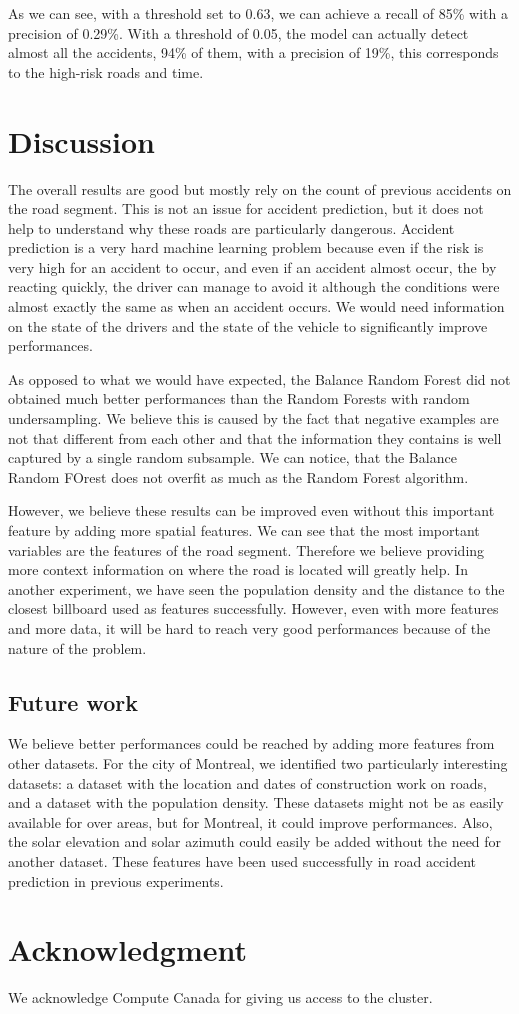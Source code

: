 \documentclass[conference]{IEEEtran}
\begin{document}
As we can see, with a threshold set to 0.63, we can achieve a recall of 85\% with a precision of 0.29\%. With a threshold of 0.05, the model can actually detect almost all the accidents, 94\% of them, with a precision of 19\%, this corresponds to the high-risk roads and time.

\section{Discussion}
The overall results are good but mostly rely on the count of previous accidents on the road segment. This is not an issue for accident prediction, but it does not help to understand why these roads are particularly dangerous. Accident prediction is a very hard machine learning problem because even if the risk is very high for an accident to occur, and even if an accident almost occur, the by reacting quickly, the driver can manage to avoid it although the conditions were almost exactly the same as when an accident occurs. We would need information on the state of the drivers and the state of the vehicle to significantly improve performances. 

As opposed to what we would have expected, the Balance Random Forest did not obtained much better performances than the Random Forests with random undersampling. We believe this is caused by the fact that negative examples are not that different from each other and that the information they contains is well captured by a single random subsample. We can notice, that the Balance Random FOrest does not overfit as much as the Random Forest algorithm.

However, we believe these results can be improved even without this important feature by adding more spatial features. We can see that the most important variables are the features of the road segment. Therefore we believe providing more context information on where the road is located will greatly help. In another experiment, we have seen the population density and the distance to the closest billboard used as features successfully. However, even with more features and more data, it will be hard to reach very good performances because of the nature of the problem.

\subsection{Future work}
We believe better performances could be reached by adding more features from other datasets. For the city of Montreal, we identified two particularly interesting datasets: a dataset with the location and dates of construction work on roads, and a dataset with the population density. These datasets might not be as easily available for over areas, but for Montreal, it could improve performances. Also, the solar elevation and solar azimuth could easily be added without the need for another dataset. These features have been used successfully in road accident prediction in previous experiments.

\section*{Acknowledgment}

We acknowledge Compute Canada for giving us access to the cluster.



\end{document}
